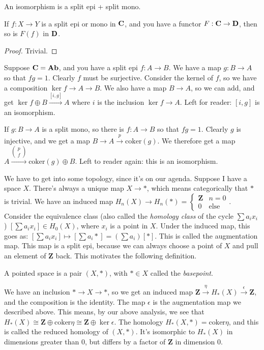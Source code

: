 \begin{example}
An isomorphism is a split epi + split mono.
\end{example}
\begin{lemma}
If $f:X\to Y$ is a split epi or mono in $\mathbf C$, and you have a functor $F:\mathbf C\to \mathbf D$, then so is $F(f)$ in $\mathbf D$.
\end{lemma}
\begin{proof}
Trivial.
\end{proof}
\begin{example}
Suppose $\mathbf C=\mathbf{Ab}$, and you have a split epi $f:A\to B$. We have a map $g:B\to A$ so that $fg=1$. Clearly $f$ must be surjective. Consider the kernel of $f$, so we have a composition $\ker f\to A\to B$. We also have a map $B\to A$, so we can add, and get $\ker f\oplus B\xrightarrow{[i,g]} A$ where $i$ is the inclusion $\ker f\to A$. Left for reader: $[i,g]$ is an isomorphism.

If $g:B\to A$ is a split mono, so there is $f:A\to B$ so that $fg=1$. Clearly $g$ is injective, and we get a map $B\to A\xrightarrow{p}\mathrm{coker}(g)$. We therefore get a map $A\xrightarrow{\begin{pmatrix}
p \\ f
\end{pmatrix}}\mathrm{coker}(g)\oplus B$. Left to reader again: this is an isomorphism.
\end{example}
We have to get into some topology, since it's on our agenda. Suppose I have a space $X$. There's always a unique map $X\to\ast$, which means categorically that $\ast$ is trivial. We have an induced map $ H_n(X)\to H_n(\ast)=\begin{cases}\mathbf{Z} & n=0\\
0 & \text{else}\end{cases}$. Consider the equivalence class (also called the \textit{homology class} of the cycle $\sum a_ix_i$) $\left[\sum a_ix_i\right]\in H_0(X)$, where $x_i$ is a point in $X$. Under the induced map, this goes as: $\left[\sum a_ix_i\right]\mapsto \left[\sum a_i\ast\right]=\left(\sum a_i\right)\left[\ast\right]$. This is called the augmentation map. This map is a split epi, because we can always choose a point of $X$ and pull an element of $\mathbf{Z}$ back. This motivates the following definition.
\begin{definition}
A pointed space is a pair $(X,\ast)$, with $\ast\in X$ called the \textit{basepoint}.
\end{definition}
We have an inclusion $\ast\to X\to\ast$, so we get an induced map $\mathbf{Z}\xrightarrow{\eta} H_\ast(X)\xrightarrow{\epsilon}\mathbf{Z}$, and the composition is the identity. The map $\epsilon$ is the augmentation map we described above. This means, by our above analysis, we see that $ H_\ast(X)\cong \mathbf{Z}\oplus\mathrm{coker}\eta \cong\mathbf{Z}\oplus\ker\epsilon$. The homology $ H_\ast(X,\ast)=\mathrm{coker}\eta$, and this is called the reduced homology of $(X,\ast)$. It's isomorphic to $ H_\ast(X)$ in dimensions greater than $0$, but differs by a factor of $\mathbf{Z}$ in dimension $0$.

